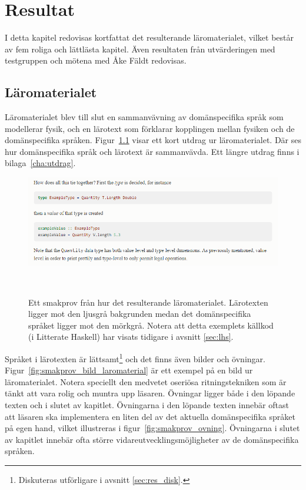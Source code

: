 \chapter{Resultat}

I detta kapitel redovisas kortfattat det resulterande läromaterialet, vilket består av fem roliga och lättlästa kapitel. Även
resultaten från utvärderingen med testgruppen och mötena med Åke Fäldt redovisas.

\section{Läromaterialet}\label{sec:res_laromaterial}

Läromaterialet blev till slut en sammanvävning av domänspecifika språk som
modellerar fysik, och en lärotext som förklarar kopplingen mellan fysiken och de
domänspecifika språken. Figur~\ref{fig:smakprov_laromaterial} visar ett kort
utdrag ur läromaterialet. Där ses hur domänspecifika språk och lärotext
är sammanvävda. Ett längre utdrag finns i bilaga~\ref{cha:utdrag}.

\begin{figure}[tph]
  \includegraphics[width=\linewidth]{figure/smakprov_laromaterial.png}
  \caption{Ett smakprov från hur det resulterande läromaterialet. Lärotexten ligger mot den ljusgrå bakgrunden medan det domänspecifika språket ligger mot den mörkgrå. Notera att detta exemplets källkod (i Litterate Haskell) har visats tidigare i avsnitt \ref{sec:lhs}.}~\label{fig:smakprov_laromaterial} 
\end{figure}

Språket i lärotexten är lättsamt\footnote{Diskuteras utförligare i avsnitt \ref{sec:res_disk}.} och det finns även bilder och övningar.
Figur~\ref{fig:smakprov_bild_laromaterial} är ett exempel på en bild ur
läromaterialet. Notera speciellt den medvetet oseriösa ritningstekniken som är
tänkt att vara rolig och muntra upp läsaren. Övningar ligger både i den löpande
texten och i slutet av kapitlet. Övningarna i den löpande texten innebär oftast
att läsaren ska implementera en liten del av det aktuella domänspecifika språket
på egen hand, vilket illustreras i figur~\ref{fig:smakprov_ovning}. Övningarna i slutet av kapitlet innebär ofta större vidareutvecklingsmöjligheter av de domänspecifika språken.


